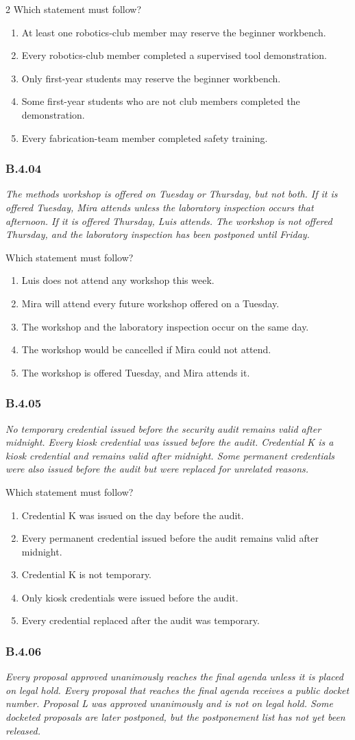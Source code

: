 \documentclass[10pt]{extarticle}
\newcommand{\choice}[1]{\item #1}
\newcommand{\bankitem}[1]{\subsubsection*{#1}}
\begin{document}
\begin{multicols}{2}
Which statement must follow?
\begin{enumerate}[label=(\alph*)]
  \choice{At least one robotics-club member may reserve the beginner workbench.}
  \choice{Every robotics-club member completed a supervised tool demonstration.}
  \choice{Only first-year students may reserve the beginner workbench.}
  \choice{Some first-year students who are not club members completed the demonstration.}
  \choice{Every fabrication-team member completed safety training.}
\end{enumerate}
\bankitem{B.4.04}
\emph{The methods workshop is offered on Tuesday or Thursday, but not both. If it is offered Tuesday, Mira attends unless the laboratory inspection occurs that afternoon. If it is offered Thursday, Luis attends. The workshop is not offered Thursday, and the laboratory inspection has been postponed until Friday.}

Which statement must follow?
\begin{enumerate}[label=(\alph*)]
  \choice{Luis does not attend any workshop this week.}
  \choice{Mira will attend every future workshop offered on a Tuesday.}
  \choice{The workshop and the laboratory inspection occur on the same day.}
  \choice{The workshop would be cancelled if Mira could not attend.}
  \choice{The workshop is offered Tuesday, and Mira attends it.}
\end{enumerate}
\bankitem{B.4.05}
\emph{No temporary credential issued before the security audit remains valid after midnight. Every kiosk credential was issued before the audit. Credential K is a kiosk credential and remains valid after midnight. Some permanent credentials were also issued before the audit but were replaced for unrelated reasons.}

Which statement must follow?
\begin{enumerate}[label=(\alph*)]
  \choice{Credential K was issued on the day before the audit.}
  \choice{Every permanent credential issued before the audit remains valid after midnight.}
  \choice{Credential K is not temporary.}
  \choice{Only kiosk credentials were issued before the audit.}
  \choice{Every credential replaced after the audit was temporary.}
\end{enumerate}
\bankitem{B.4.06}
\emph{Every proposal approved unanimously reaches the final agenda unless it is placed on legal hold. Every proposal that reaches the final agenda receives a public docket number. Proposal L was approved unanimously and is not on legal hold. Some docketed proposals are later postponed, but the postponement list has not yet been released.}


\end{multicols}
\end{document}
